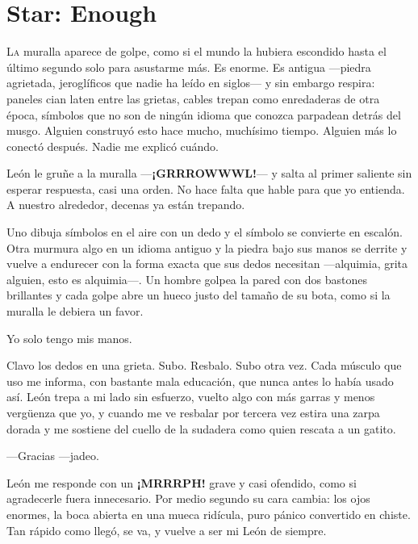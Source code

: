 \renewcommand{\chaptertitlename}{Chapter}
\chapter{Star: Enough}
\renewcommand{\chaptertitlename}{Capítulo}


\lettrine{L}{a} muralla aparece de golpe, como si el mundo la hubiera escondido hasta el último segundo solo para asustarme más. Es enorme. Es antigua —piedra agrietada, jeroglíficos que nadie ha leído en siglos— y sin embargo respira: paneles cian laten entre las grietas, cables trepan como enredaderas de otra época, símbolos que no son de ningún idioma que conozca parpadean detrás del musgo. Alguien construyó esto hace mucho, muchísimo tiempo. Alguien más lo conectó después. Nadie me explicó cuándo.


León le gruñe a la muralla —\textbf{¡GRRROWWWL!}— y salta al primer saliente sin esperar respuesta, casi una orden. No hace falta que hable para que yo entienda. A nuestro alrededor, decenas ya están trepando.

Uno dibuja símbolos en el aire con un dedo y el símbolo se convierte en escalón. Otra murmura algo en un idioma antiguo y la piedra bajo sus manos se derrite y vuelve a endurecer con la forma exacta que sus dedos necesitan —alquimia, grita alguien, esto es alquimia—. Un hombre golpea la pared con dos bastones brillantes y cada golpe abre un hueco justo del tamaño de su bota, como si la muralla le debiera un favor.

Yo solo tengo mis manos.

Clavo los dedos en una grieta. Subo. Resbalo. Subo otra vez. Cada músculo que uso me informa, con bastante mala educación, que nunca antes lo había usado así. León trepa a mi lado sin esfuerzo, vuelto algo con más garras y menos vergüenza que yo, y cuando me ve resbalar por tercera vez estira una zarpa dorada y me sostiene del cuello de la sudadera como quien rescata a un gatito.

—Gracias —jadeo.

León me responde con un \textbf{¡MRRRPH!} grave y casi ofendido, como si agradecerle fuera innecesario. Por medio segundo su cara cambia: los ojos enormes, la boca abierta en una mueca ridícula, puro pánico convertido en chiste. Tan rápido como llegó, se va, y vuelve a ser mi León de siempre.

